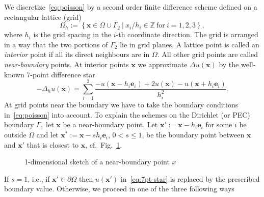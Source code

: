 We discretize~\eqref{eq:poisson} by a second order finite difference
scheme defined on a rectangular lattice (grid)
\begin{displaymath}
  \Omega_h:=\left\{ \mathbf{x} \in {\Omega}\cup\Gamma_2 \ |\ x_i/h_i \in
    \mathbb{Z} \ \mbox{for}\ i=1,2,3 \right\},
\end{displaymath}
where $h_i$ is the grid spacing in the $i$-th coordinate direction. The
grid is arranged in a way that the two portions of $\Gamma_2$ lie in
grid planes.  A lattice point is called an \emph{interior} point if all
its direct neighbours are in $\Omega$.  All other grid points are called
\emph{near-boundary} points.  At interior points $\mathbf{x}$ we
approximate $\Delta u (\mathbf{x})$ by the well-known 7-point difference
star
\begin{equation}  \label{eq:7pt-star}
  -\Delta_h u(\mathbf{x}) = 
  \sum_{i=1}^3
  \frac{-u(\mathbf{x}\!-\!h_i\mathbf{e}_i) + 2 u(\mathbf{x})
  - u(\mathbf{x}\!+\!h_i\mathbf{e}_i)}{h_i^2}.
\end{equation}
At grid points near the boundary we have to take the boundary conditions
in~\eqref{eq:poisson} into account.  To explain the schemes on the
Dirichlet (or PEC) boundary $\Gamma_1$ let $\mathbf{x}$ be a
near-boundary point.  Let $\mathbf{x}' := \mathbf{x} - h_i\mathbf{e}_i$
for some $i$ be outside $\Omega$ and let $\mathbf{x}^* := \mathbf{x} - s
h_i\mathbf{e}_i$, $0<s\le1$, be the boundary point between $\mathbf{x}$
and $\mathbf{x}'$ that is closest to $\mathbf{x}$,
cf.~Fig.~\ref{fig:boundary}.
\begin{figure}[htb]
  \centering
  
  \caption{1-dimensional sketch of a near-boundary point $x$}
  \label{fig:boundary}
\end{figure}
If $s=1$, i.e., if $\mathbf{x}'\in \partial\Omega$ then $u(\mathbf{x}')$
in~\eqref{eq:7pt-star} is replaced by the prescribed boundary value.
Otherwise, we proceed in one of the three following ways~\cite{fowa:60,
  hack:94}
